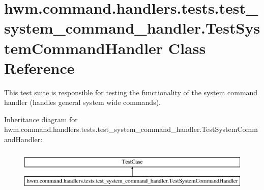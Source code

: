 \hypertarget{classhwm_1_1command_1_1handlers_1_1tests_1_1test__system__command__handler_1_1_test_system_command_handler}{\section{hwm.\-command.\-handlers.\-tests.\-test\-\_\-system\-\_\-command\-\_\-handler.\-Test\-System\-Command\-Handler Class Reference}
\label{classhwm_1_1command_1_1handlers_1_1tests_1_1test__system__command__handler_1_1_test_system_command_handler}
}


This test suite is responsible for testing the functionality of the system command handler (handles general system wide commands).  


Inheritance diagram for hwm.\-command.\-handlers.\-tests.\-test\-\_\-system\-\_\-command\-\_\-handler.\-Test\-System\-Command\-Handler\-:\begin{figure}[H]
\begin{center}
\leavevmode
\includegraphics[height=2.000000cm]{classhwm_1_1command_1_1handlers_1_1tests_1_1test__system__command__handler_1_1_test_system_command_handler}
\end{center}
\end{figure}
